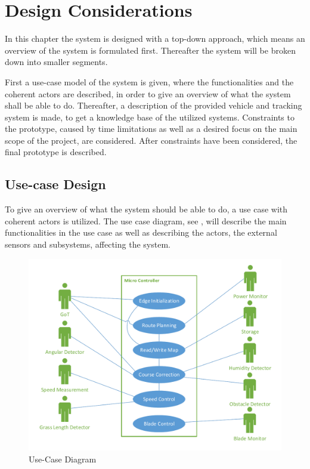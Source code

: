 \chapter{Design Considerations}
\vspace{-5 mm}
In this chapter the system is designed with a top-down approach, which means an overview of the system is formulated first. Thereafter the system will be broken down into smaller segments.

First a use-case model of the system is given, where the functionalities and the coherent actors are described, in order to give an overview of what the system shall be able to do. Thereafter, a description of the provided vehicle and tracking system is made, to get a knowledge base of the utilized systems. Constraints to the prototype, caused by time limitations as well as a desired focus on the main scope of the project, are considered.
After constraints have been considered, the final prototype is described.
\vspace{-4 mm}
\section{Use-case Design} \label{sec:UseCase}
To give an overview of what the system should be able to do, a use case with coherent actors is utilized. The use case diagram, see , will describe the main functionalities in the use case as well as describing the actors, the external sensors and subsystems, affecting the system.

%
 \begin{figure}[H]
	\centering
	\includegraphics[scale=0.8]{figures/P5UseCase.pdf}
	\caption{Use-Case Diagram}
	\label{fig:usecase}
\end{figure}

